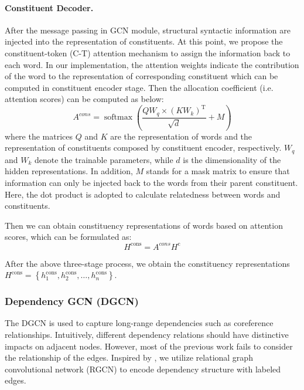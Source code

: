 \documentclass{article}
\begin{document}
\paragraph{Constituent Decoder.}
After the message passing in GCN module, structural syntactic information are injected into the representation of constituents. At this point, we propose the constituent-token (C-T) attention mechanism to assign the information back to each word. In our implementation, the attention weights indicate the contribution of the word to the representation of corresponding constituent which can be computed in constituent encoder stage. Then the allocation coefficient (i.e. attention scores) can be computed as below:
\begin{equation}
	A^{cons} = \operatorname{softmax}\left(\frac{QW_q \times \left(KW_k\right)^{\mathrm{T}}}{\sqrt{d}} + M\right) \label{eq2}
\end{equation}
where the matrices $Q$ and $K$ are the representation of words and the representation of constituents composed by constituent encoder, respectively. $W_q$ and $W_k$ denote the trainable parameters, while $d$ is the dimensionality of the hidden representations. In addition, $M$ stands for a mask matrix to ensure that information can only be injected back to the words from their parent constituent. Here, the dot product is adopted to calculate relatedness between words and constituents.

Then we can obtain constituency representations of words based on attention scores, which can be formulated as:
\begin{equation}
 	H^{\text{cons}} = A^{cons} H^{\text{c}} \label{eq3}
\end{equation}

After the above three-stage process, we obtain the constituency representations $H^{\text{cons}} = \left\{h_{1}^{\text {cons}}, h_{2}^{\text {cons}}, \ldots, h_{n}^{\text {cons}}\right\}$.

\subsubsection{Dependency GCN (DGCN)}

The DGCN is used to capture long-range dependencies such as coreference relationships. Intuitively, different dependency relations should have distinctive impacts on adjacent nodes. However, most of the previous work fails to consider the relationship of the edges. Inspired by \cite{schlichtkrull2018modeling}, we utilize relational graph convolutional network (RGCN) to encode dependency structure with labeled edges.
\end{document}

